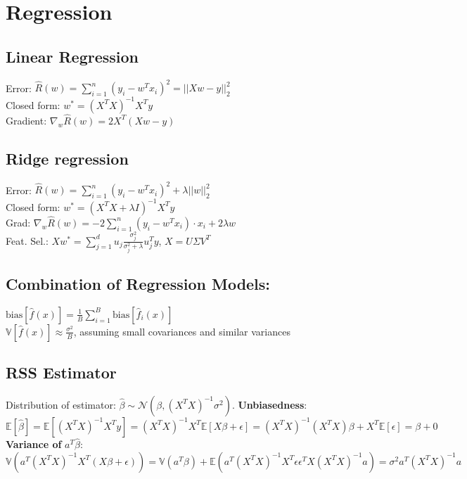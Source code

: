 \section{Regression}
\subsection*{Linear Regression}
Error: $\hat{R}(w) = \sum_{i=1}^n (y_i - w^Tx_i)^2 = ||Xw-y||^2_2$\\
Closed form: $w^*=(X^T X)^{-1} X^T y$\\
Gradient: $\nabla_w \hat{R}(w) = 2X^T (Xw-y)$
\subsection*{Ridge regression}
Error: $\hat{R}(w) = \sum \limits_{i=1}^n (y_i - w^Tx_i)^2 + \lambda ||w||_2^2$\\
Closed form: $w^*=(X^T X + \lambda I)^{-1} X^T y$\\
Grad: $\nabla_w \hat{R}(w) = -2 \sum_{i=1}^n (y_i-w^T x_i) \cdot x_i + 2 \lambda w$\\
Feat. Sel.: $Xw^*=\sum_{j=1}^{d} u_j\frac{\sigma_j^2}{\sigma_j^2+\lambda}u_j^Ty$, $X=U\Sigma V^T$


\subsection*{Combination of Regression Models:}
$\text{bias}[\hat{f}(x)] = \frac{1}{B} \sum_{i=1}^{B} \text{bias}[\hat{f}_i(x)]$\\
$\mathbb{V}[\hat{f}(x)] \approx \frac{\sigma^2}{B}$, assuming small covariances and similar variances


\subsection*{RSS Estimator}
Distribution of estimator: $\hat{\beta} \sim \mathcal{N}(\beta,(X^TX)^{-1}\sigma^2)$.
\textbf{Unbiasedness}: $\mathbb{E}[\hat{\beta}] = \mathbb{E}[(X^TX)^{-1}X^Ty] = (X^TX)^{-1}X^T\mathbb{E}[X\beta+\epsilon] = (X^TX)^{-1}(X^TX)\beta+X^T\mathbb{E}[\epsilon] = \beta + 0$
\textbf{Variance of} $a^T\hat{\beta}$: $\mathbb{V}(a^T(X^TX)^{-1}X^T(X\beta + \epsilon)) = \mathbb{V}(a^T\beta) + \mathbb{E}(a^T(X^TX)^{-1}X^T\epsilon\epsilon^TX(X^TX)^{-1}a) = \sigma^2 a^T(X^TX)^{-1}a$ 

